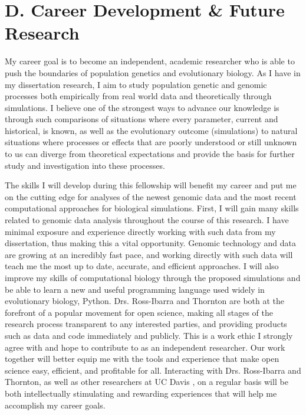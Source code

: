 {%
\section*{D. Career Development \& Future Research}

My career goal is to become an independent, academic researcher who is able to push the boundaries of population genetics and evolutionary biology. As I have in my dissertation research, I aim to study population genetic and genomic processes both empirically from real world data and theoretically through simulations.  I believe one of the strongest ways to advance our knowledge is through such comparisons of situations where every parameter, current and historical, is known, as well as the evolutionary outcome (simulations) to natural situations where processes or effects that are poorly understood or still unknown to us can diverge from theoretical expectations and provide the basis for further study and investigation into these processes. 

The skills I will develop during this fellowship will benefit my career and put me on the cutting edge for analyses of the newest genomic data and the most recent computational approaches for biological simulations. First, I will gain many skills related to genomic data analysis throughout the course of this research. I have minimal exposure and experience directly working with such data from my dissertation, thus making this a vital opportunity. Genomic technology and data are growing at an incredibly fast pace, and working directly with such data will teach me the most up to date, accurate, and efficient approaches. I will also improve my skills of computational biology through the proposed simulations and be able to learn a new and useful programming language used widely in evolutionary biology, Python. Drs. Ross\--Ibarra and Thornton are both at the forefront of a popular  movement for open science, making all stages of the research process transparent to any interested parties, and providing products such as data and code immediately and publicly. This is a work ethic I strongly agree with and hope to contribute to as an independent researcher. Our work together will better equip me with the tools and experience that make open science easy, efficient, and profitable for all.  Interacting with Drs. Ross\--Ibarra and Thornton, as well as other researchers at UC Davis , on a regular basis will be both intellectually stimulating and rewarding experiences that will help me accomplish my career goals.

}
